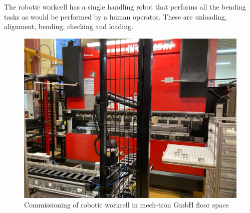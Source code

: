 The robotic workcell has a single handling robot that performs all the bending tasks as would be performed by a human operator. These are unloading, alignment, bending, checking and loading.

\begin{figure}[h]
    \centering
    \includegraphics[width=\textwidth]{figures/commissioning.jpeg}
    \caption{Commissioning of robotic workcell in mech-tron GmbH floor space}
    \label{fig:commissioning}
\end{figure}